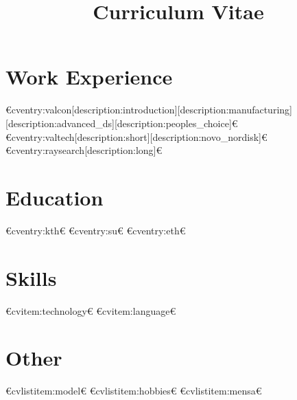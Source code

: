 
\title{Curriculum Vitae}



\newcommand{\role}{Senior Data Scientist}
\newcommand{\company}{Novo Nordisk}



  \makecvtitle
  

  \section{Work Experience}
  €cventry:valcon[description:introduction][description:manufacturing][description:advanced_ds][description:peoples_choice]€
  €cventry:valtech[description:short][description:novo_nordisk]€
  €cventry:raysearch[description:long]€

  \section{Education}
  €cventry:kth€
  €cventry:su€
  €cventry:eth€

  \section{Skills}
  €cvitem:technology€
  €cvitem:language€

  \section{Other}
  €cvlistitem:model€
  €cvlistitem:hobbies€
  €cvlistitem:mensa€

  
